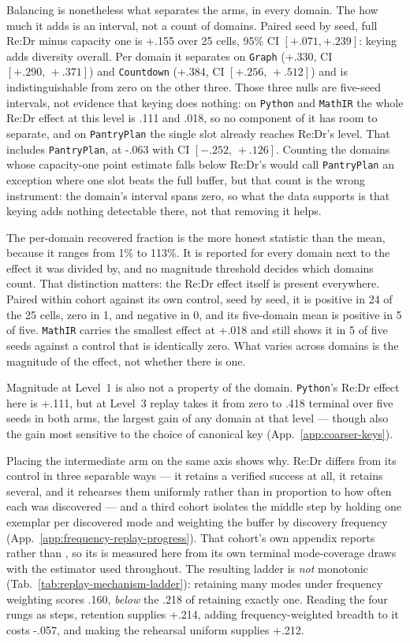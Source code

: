 Balancing is nonetheless what separates the arms, in every domain. The
how much it adds is an interval, not a count of domains. Paired seed by seed,
full Re:Dr minus capacity one is +.155 over 25
cells, 95\% CI $[+.071, +.239]$: keying adds diversity
overall. Per domain it separates on \texttt{Graph} (+.330, CI
$[+.290,\,+.371]$) and \texttt{Countdown} (+.384, CI
$[+.256,\,+.512]$) and is indistinguishable from zero on the other
three. Those three nulls are five-seed intervals, not evidence that keying does
nothing: on \texttt{Python} and \texttt{MathIR} the whole Re:Dr effect at this
level is .111 and .018, so no component of it has
room to separate, and on \texttt{PantryPlan} the single slot already reaches
Re:Dr's level. That includes \texttt{PantryPlan}, at -.063 with CI
$[-.252,\,+.126]$. Counting the domains whose capacity-one point
estimate falls below Re:Dr's would call \texttt{PantryPlan} an exception
where one slot beats the full buffer, but that count is the wrong
instrument: the domain's interval spans zero, so what
the data supports is that keying adds nothing detectable there, not that
removing it helps.

The per-domain recovered fraction is the more honest statistic than the mean,
because it ranges from 1\% to 113\%. It is
reported for every domain next to the effect it was divided by, and no
magnitude threshold decides which domains count. That distinction matters:
the Re:Dr effect itself is present everywhere. Paired within cohort against
its own control, seed by seed, it is positive in 24 of the
25 cells, zero in 1, and negative in 0, and its
five-domain mean is positive in 5 of five. \texttt{MathIR}
carries the smallest effect at +.018 and still shows it in
5 of five seeds against a control that is identically zero.
What varies across domains is the magnitude of the effect, not whether there
is one.

Magnitude at Level~1 is also not a property of the domain. \texttt{Python}'s
Re:Dr effect here is +.111, but at Level~3 replay takes it from
zero to .418 terminal \pmd{} over five seeds in both arms, the
largest gain of any domain at that level --- though also the gain most
sensitive to the choice of canonical key (App.~\ref{app:coarser-keys}).

Placing the intermediate arm on the same axis shows why. Re:Dr differs from
its control in three separable ways --- it retains a verified success at all,
it retains several, and it rehearses them uniformly rather than in proportion
to how often each was discovered --- and a third cohort isolates the middle
step by holding one exemplar per discovered mode and weighting the buffer by
discovery frequency (App.~\ref{app:frequency-replay-progress}). That cohort's
own appendix reports \distk{} rather than \pmd{}, so its \pmd{} is measured
here from its own terminal mode-coverage draws with the estimator used
throughout. The resulting ladder is \emph{not} monotonic
(Tab.~\ref{tab:replay-mechanism-ladder}): retaining many modes under
frequency weighting scores .160, \emph{below} the .218 of
retaining exactly one. Reading the four rungs as steps, retention supplies
+.214, adding frequency-weighted breadth to it costs
-.057, and making the rehearsal uniform supplies +.212.

